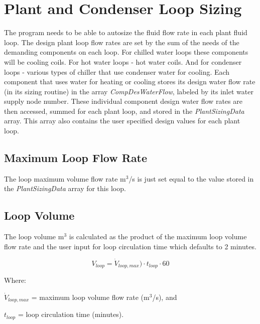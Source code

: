 \section{Plant and Condenser Loop Sizing}\label{plant-condenser-loop-sizing}

The program needs to be able to autosize the fluid flow rate in each plant fluid loop. The design plant loop flow rates are set by the sum of the needs of the demanding components on each loop. For chilled water loops these components will be cooling coils. For hot water loops - hot water coils. And for condenser loops - various types of chiller that use condenser water for cooling. Each component that uses water for heating or cooling stores its design water flow rate (in its sizing routine) in the array \emph{CompDesWaterFlow}, labeled by its inlet water supply node number. These individual component design water flow rates are then accessed, summed for each plant loop, and stored in the \emph{PlantSizingData} array. This array also contains the user specified design values for each plant loop.

\subsection{Maximum Loop Flow Rate}\label{maximum-loop-flow-rate}

The loop maximum volume flow rate m\(^{3}\)/s is just set equal to the value stored in the \emph{PlantSizingData} array for this loop.

\subsection{Loop Volume}\label{volume-of-the-plant-loop}

The loop volume m\(^{3}\) is calculated as the product of the maximum loop volume flow rate and the user input for loop circulation time which defaults to 2 minutes.

\begin{equation}
V_{loop} = \dot{V}_{loop,max}) \cdot t_{loop} \cdot 60
\end{equation}

Where:

\(\dot{V}_{loop,max}\) = maximum loop volume flow rate  (m\(^{3}\)/s), and
 
\(t_{loop}\) = loop circulation time (minutes).
